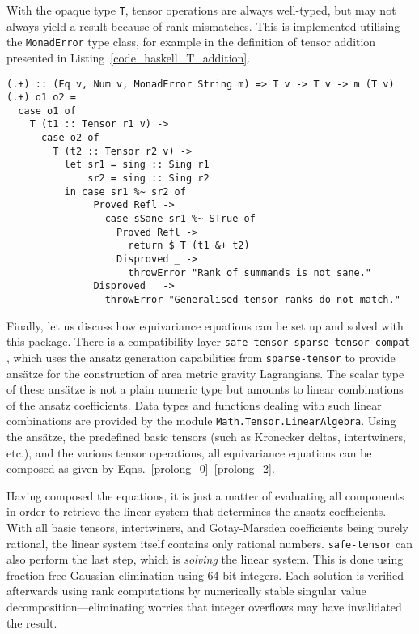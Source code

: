 With the opaque type \texttt{T}, tensor operations are always well-typed, but may not always yield a result because of rank mismatches. This is implemented utilising the \texttt{MonadError} type class, for example in the definition of tensor addition presented in Listing~\ref{code_haskell_T_addition}.

\begin{code}
  \begin{verbatim}
(.+) :: (Eq v, Num v, MonadError String m) => T v -> T v -> m (T v)
(.+) o1 o2 =
  case o1 of
    T (t1 :: Tensor r1 v) ->
      case o2 of
        T (t2 :: Tensor r2 v) ->
          let sr1 = sing :: Sing r1
              sr2 = sing :: Sing r2
          in case sr1 %~ sr2 of
               Proved Refl ->
                 case sSane sr1 %~ STrue of
                   Proved Refl ->
                     return $ T (t1 &+ t2)
                   Disproved _ ->
                     throwError "Rank of summands is not sane."
               Disproved _ ->
                 throwError "Generalised tensor ranks do not match."
  \end{verbatim}
  \label{code_haskell_T_addition}
\end{code}

Finally, let us discuss how equivariance equations can be set up and solved with this package. There is a compatibility layer \texttt{safe-tensor-sparse-tensor-compat} \cite{Alex_2020_safe-tensor}, which uses the ansatz generation capabilities from \texttt{sparse-tensor} to provide ansätze for the construction of area metric gravity Lagrangians. The scalar type of these ansätze is not a plain numeric type but amounts to linear combinations of the ansatz coefficients. Data types and functions dealing with such linear combinations are provided by the module \texttt{Math.Tensor.LinearAlgebra}. Using the ansätze, the predefined basic tensors (such as Kronecker deltas, intertwiners, etc.), and the various tensor operations, all equivariance equations can be composed as given by Eqns.\ \eqref{prolong_0}--\eqref{prolong_2}.

Having composed the equations, it is just a matter of evaluating all components in order to retrieve the linear system that determines the ansatz coefficients. With all basic tensors, intertwiners, and Gotay-Marsden coefficients being purely rational, the linear system itself contains only rational numbers. \texttt{safe-tensor} can also perform the last step, which is \emph{solving} the linear system. This is done using fraction-free Gaussian elimination using 64-bit integers. Each solution is verified afterwards using rank computations by numerically stable singular value decomposition---eliminating worries that integer overflows may have invalidated the result.


